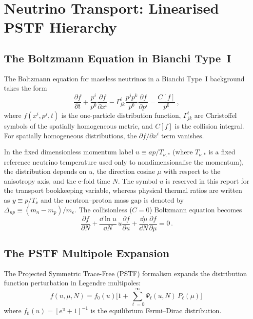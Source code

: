\section{Neutrino Transport: Linearised PSTF Hierarchy}\label{sec:transport}

\subsection{The Boltzmann Equation in Bianchi Type~I}

The Boltzmann equation for massless neutrinos in a Bianchi Type~I background takes the form
\begin{equation}
\frac{\partial f}{\partial t} + \frac{p^i}{p^0}\frac{\partial f}{\partial x^i} - \Gamma^i_{jk}\frac{p^j p^k}{p^0}\frac{\partial f}{\partial p^i} = \frac{C[f]}{p^0}\,,\label{eq:boltzmann_general}
\end{equation}
where $f(x^i, p^j, t)$ is the one-particle distribution function, $\Gamma^i_{jk}$ are Christoffel symbols of the spatially homogeneous metric, and $C[f]$ is the collision integral.  For spatially homogeneous distributions, the $\partial f/\partial x^i$ term vanishes.

In the fixed dimensionless momentum label $u \equiv ap/T_{\nu,\ast}$ (where $T_{\nu,\ast}$ is a fixed reference neutrino temperature used only to nondimensionalise the momentum), the distribution depends on $u$, the direction cosine $\mu$ with respect to the anisotropy axis, and the e-fold time $N$.  The symbol $u$ is reserved in this report for the transport bookkeeping variable, whereas physical thermal ratios are written as $y \equiv p/T_\nu$ and the neutron--proton mass gap is denoted by $\Delta_{np} \equiv (m_n-m_p)/m_e$.  The collisionless ($C = 0$) Boltzmann equation becomes
\begin{equation}
\frac{\partial f}{\partial N} + \frac{\dd \ln u}{\dd N}\,u\frac{\partial f}{\partial u} + \frac{\dd\mu}{\dd N}\frac{\partial f}{\partial \mu} = 0\,.\label{eq:boltzmann_N}
\end{equation}

\subsection{The PSTF Multipole Expansion}

The Projected Symmetric Trace-Free (PSTF) formalism expands the distribution function perturbation in Legendre multipoles:
\begin{equation}
f(u, \mu, N) = f_0(u)\bigl[1 + \sum_{\ell=0}^{\infty} \Psi_\ell(u, N)\,P_\ell(\mu)\bigr]\,
\end{equation}
where $f_0(u) = [e^u + 1]^{-1}$ is the equilibrium Fermi--Dirac distribution.

